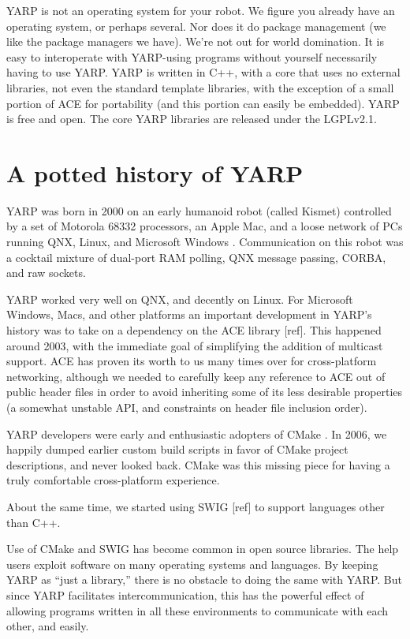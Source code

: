 \documentclass[letterpaper]{article}
\begin{document}
YARP is not an operating system for your robot. We figure you already
have an operating system, or perhaps several. Nor does it do package
management (we like the package managers we have). We're not out for
world domination. It is easy to interoperate with YARP-using programs
without yourself necessarily having to use YARP. 
YARP is written in C++, with a core that uses
no external libraries, not even the standard template libraries, with
the exception of a small portion of ACE for portability (and this
portion can easily be embedded). YARP is free and open.  The
core YARP libraries are released under the LGPLv2.1.


\section{A potted history of YARP}

YARP was born in 2000 on an early humanoid robot (called Kismet)
controlled by a set of Motorola 68332 processors, an Apple Mac, and a
loose network of PCs running QNX, Linux, and Microsoft Windows
\cite{metta06yarp}.  Communication on this robot was a cocktail
mixture of dual-port RAM polling, QNX message passing, CORBA, and raw
sockets.

YARP worked very well on QNX, and decently on Linux.  For Microsoft
Windows, Macs, and other platforms an important development in YARP's
history was to take on a dependency on the ACE library [ref].  This
happened around 2003, with the immediate goal of simplifying the
addition of multicast support.  ACE has proven its worth to us many
times over for cross-platform networking, although we needed
to carefully keep any reference to ACE out of public header files
in order to avoid inheriting some of its less desirable properties
(a somewhat unstable API, and constraints on header file inclusion
order).

YARP developers were early and enthusiastic adopters of CMake
\cite{fitzpatrick10cmaking}.  In 2006, we happily dumped
earlier custom build scripts in favor of CMake project descriptions,
and never looked back.  CMake was this missing piece for having a
truly comfortable cross-platform experience.

About the same time, we started using SWIG [ref] to support languages
other than C++.

Use of CMake and SWIG has become common in open source libraries.
The help users exploit software on many operating systems and 
languages.  By keeping YARP as ``just a library,'' there is no
obstacle to doing the same with YARP.  But since YARP facilitates
intercommunication, this has the powerful effect of allowing 
programs written in all these environments to communicate with
each other, and easily.
\end{document}
